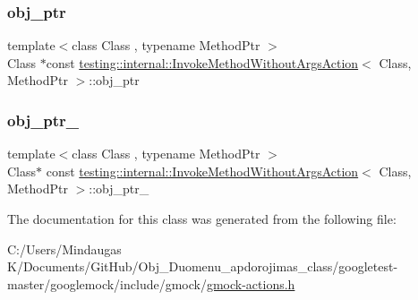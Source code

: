 \mbox{\label{structtesting_1_1internal_1_1_invoke_method_without_args_action_aca30496c75518566f1477b1b62fc6ada}} 
\subsubsection{\texorpdfstring{obj\_ptr}{obj\_ptr}}
{\footnotesize\ttfamily template$<$class Class , typename Method\+Ptr $>$ \\
Class $\ast$const \mbox{\hyperlink{structtesting_1_1internal_1_1_invoke_method_without_args_action}{testing\+::internal\+::\+Invoke\+Method\+Without\+Args\+Action}}$<$ Class, Method\+Ptr $>$\+::obj\+\_\+ptr}

\mbox{\label{structtesting_1_1internal_1_1_invoke_method_without_args_action_a43f6bbf17c63e7638e04ac5db327d6bb}} 
\subsubsection{\texorpdfstring{obj\_ptr\_}{obj\_ptr\_}}
{\footnotesize\ttfamily template$<$class Class , typename Method\+Ptr $>$ \\
Class$\ast$ const \mbox{\hyperlink{structtesting_1_1internal_1_1_invoke_method_without_args_action}{testing\+::internal\+::\+Invoke\+Method\+Without\+Args\+Action}}$<$ Class, Method\+Ptr $>$\+::obj\+\_\+ptr\+\_\+\hspace{0.3cm}{\ttfamily [private]}}



The documentation for this class was generated from the following file\+:\begin{DoxyCompactItemize}
\item 
C\+:/\+Users/\+Mindaugas K/\+Documents/\+Git\+Hub/\+Obj\+\_\+\+Duomenu\+\_\+apdorojimas\+\_\+class/googletest-\/master/googlemock/include/gmock/\mbox{\hyperlink{googletest-master_2googlemock_2include_2gmock_2gmock-actions_8h}{gmock-\/actions.\+h}}\end{DoxyCompactItemize}

